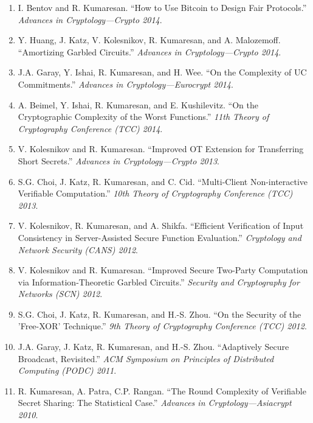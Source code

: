 \documentclass[11pt]{article}
\begin{document}
\begin{enumerate}[leftmargin=*, itemsep=1pt]
    \item I. Bentov and R. Kumaresan. ``How to Use Bitcoin to Design Fair Protocols.'' \textit{Advances in Cryptology—Crypto 2014}.
    
    \item Y. Huang, J. Katz, V. Kolesnikov, R. Kumaresan, and A. Malozemoff. ``Amortizing Garbled Circuits.'' \textit{Advances in Cryptology—Crypto 2014}.
    
    \item J.A. Garay, Y. Ishai, R. Kumaresan, and H. Wee. ``On the Complexity of UC Commitments.'' \textit{Advances in Cryptology—Eurocrypt 2014}.
    
    \item A. Beimel, Y. Ishai, R. Kumaresan, and E. Kushilevitz. ``On the Cryptographic Complexity of the Worst Functions.'' \textit{11th Theory of Cryptography Conference (TCC) 2014}.
    
    \item V. Kolesnikov and R. Kumaresan. ``Improved OT Extension for Transferring Short Secrets.'' \textit{Advances in Cryptology—Crypto 2013}.
    
    \item S.G. Choi, J. Katz, R. Kumaresan, and C. Cid. ``Multi-Client Non-interactive Verifiable Computation.'' \textit{10th Theory of Cryptography Conference (TCC) 2013}.
    
    \item V. Kolesnikov, R. Kumaresan, and A. Shikfa. ``Efficient Verification of Input Consistency in Server-Assisted Secure Function Evaluation.'' \textit{Cryptology and Network Security (CANS) 2012}.
    
    \item V. Kolesnikov and R. Kumaresan. ``Improved Secure Two-Party Computation via Information-Theoretic Garbled Circuits.'' \textit{Security and Cryptography for Networks (SCN) 2012}.
    
    \item S.G. Choi, J. Katz, R. Kumaresan, and H.-S. Zhou. ``On the Security of the 'Free-XOR' Technique.'' \textit{9th Theory of Cryptography Conference (TCC) 2012}.
    
    \item J.A. Garay, J. Katz, R. Kumaresan, and H.-S. Zhou. ``Adaptively Secure Broadcast, Revisited.'' \textit{ACM Symposium on Principles of Distributed Computing (PODC) 2011}.
    
    \item R. Kumaresan, A. Patra, C.P. Rangan. ``The Round Complexity of Verifiable Secret Sharing: The Statistical Case.'' \textit{Advances in Cryptology—Asiacrypt 2010}.
    

\end{enumerate}
\end{document}
